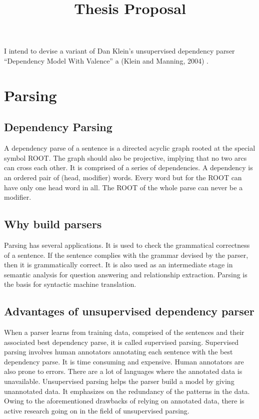\documentclass{article}
\begin{document}
\title{Thesis Proposal}

\maketitle

I intend to devise a variant of Dan Klein's unsupervised dependency parser ``Dependency Model With Valence'' a (Klein and Manning, 2004) \cite{klein2004}.

\section{Parsing}


\subsection{Dependency Parsing}

A dependency parse of a sentence is a directed acyclic graph rooted at the special symbol ROOT. The graph should also be projective, implying that no two arcs can cross each other. It is comprised of a series of dependencies. A dependency is an ordered pair of (head, modifier) words. Every word but for the ROOT can have only one head word in all. The ROOT of the whole parse can never be a modifier.

\subsection{Why build parsers}

Parsing has several applications. It is used to check the grammatical correctness of a sentence. If the sentence complies with the grammar devised by the parser, then it is grammatically correct. It is also used as an intermediate stage in semantic analysis for question answering and relationship extraction. Parsing is the basis for syntactic machine translation.

\subsection{Advantages of unsupervised dependency parser}

When a parser learns from training data, comprised of the sentences and their associated best dependency parse, it is called supervised parsing.
Supervised parsing involves human annotators annotating each sentence with the best dependency parse. It is time consuming and expensive. Human annotators are also prone to errors. There are a lot of languages where the annotated data is unavailable. Unsupervised parsing helps the parser build a model by giving unannotated data. It emphasizes on the redundancy of the patterns in the data. Owing to the aforementioned drawbacks of relying on annotated data, there is active research going on in the field of unsupervised parsing.
\end{document}
